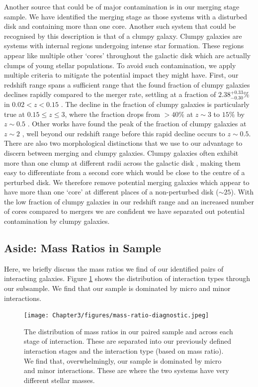 Another source that could be of major contamination is in our merging stage sample. We have identified the merging stage as those systems with a disturbed disk and containing more than one core. Another such system that could be recognised by this description is that of a clumpy galaxy. Clumpy galaxies are systems with internal regions undergoing intense star formation. These regions appear like multiple other `cores' throughout the galactic disk which are actually clumps of young stellar populations. To avoid such contamination, we apply multiple criteria to mitigate the potential impact they might have. First, our redshift range spans a sufficient range that the found fraction of clumpy galaxies declines rapidly compared to the merger rate, settling at a fraction of $2.38^{+0.33}_{-0.30}\%$ in $0.02 < z < 0.15$ \citep{2022ApJ...931...16A}. The decline in the fraction of clumpy galaxies is particularly true at $0.15 \leq z \leq 3$, where the fraction drops from $>40\%$ at $z \sim 3$ to $15\%$ by $z \sim 0.5$ \citep{2015ApJ...800...39G}. Other works have found the peak of the fraction of clumpy galaxies at $z\sim2$ \citep{2014ApJ...786...15M, 2018ApJ...853..108G}, well beyond our redshift range before this rapid decline occurs to $z \sim 0.5$. There are also two morphological distinctions that we use to our advantage to discern between merging and clumpy galaxies. Clumpy galaxies often exhibit more than one clump at different radii across the galactic disk \citep[with][finding a mean of 3.16 clumps per galaxy]{2022ApJ...931...16A}, making them easy to differentiate from a second core which would be close to the centre of a perturbed disk. We therefore remove potential merging galaxies which appear to have more than one `core' at different places of a non-perturbed disk ($\sim25$). With the low fraction of clumpy galaxies in our redshift range and an increased number of cores compared to mergers we are confident we have separated out potential contamination by clumpy galaxies.

\subsection{Aside: Mass Ratios in Sample}
Here, we briefly discuss the mass ratios we find of our identified pairs of interacting galaxies. Figure \ref{fig:mass-ratio} shows the distribution of interaction types through our subsample. We find that our sample is dominated by micro and minor interactions.

\begin{figure}
\centering
\texttt{[image: Chapter3/figures/mass-ratio-diagnostic.jpeg]}
\caption[The distribution of mass ratios in our paired sample and across each stage of interaction.]{The distribution of mass ratios in our paired sample and across each stage of interaction. These are separated into our previously defined interaction stages and the interaction type (based on mass ratio). We find that, overwhelmingly, our sample is dominated by micro and minor interactions. These are where the two systems have very different stellar masses.}
\label{fig:mass-ratio}
\end{figure}

